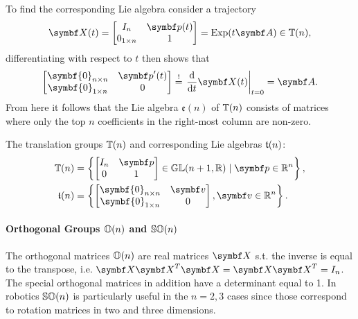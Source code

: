 To find the corresponding Lie algebra consider a trajectory
\begin{equation}
  \X(t) = \begin{bmatrix} I_{n} & \bp(t) \\ 0_{1 \times n} & 1 \end{bmatrix} = \Exp(t \A) \in \Tn,
\end{equation}
differentiating with respect to $t$ then shows that
\begin{equation}
  \begin{bmatrix}
    \symbf{0}_{n \times n} & \bp'(t) \\ \symbf{0}_{1 \times n} & 0
  \end{bmatrix} \overset{!}{=} \left.\frac{\mathrm{d}}{\mathrm{d}t} \X(t) \right|_{t = 0} = \A.
\end{equation}
From here it follows that the Lie algebra $\mathfrak{e}(n)$ of ${\mathbb{T}(n)}$ consists of matrices where only the top $n$ coefficients in the right-most column are non-zero.
\begin{important}
  The translation groups ${\mathbb{T}(n)}$ and corresponding Lie algebras ${\mathfrak{t}(n)}$:
  \begin{subequations}
    \begin{align}
      \Tn & = \left\{\begin{bmatrix} I_{n} & \bp \\ 0 & 1 \end{bmatrix} \in \GL(n+1, \mathbb{R}) \mid \bp \in \mathbb{R}^{n} \right\}, \\
      \tn & = \left\{ \begin{bmatrix} \symbf{0}_{n \times n} & \bv \\ \symbf{0}_{1 \times n} & 0\end{bmatrix}, \bv \in \mathbb{R}^n \right\}.
    \end{align}
  \end{subequations}
\end{important}

\paragraph{Orthogonal Groups ${\mathbb{O}(n)}$ and ${\mathbb{SO}(n)}$}

The orthogonal matrices ${\mathbb{O}(n)}$ are real matrices $\X$ s.t. the inverse is equal to the transpose, i.e. $\X \X^{T} \X = \X \X^{T}= I_{n}$. The special orthogonal matrices in addition have a determinant equal to 1. In robotics ${\mathbb{SO}(n)}$ is particularly useful in the $n=2,3$ cases since those correspond to rotation matrices in two and three dimensions.

